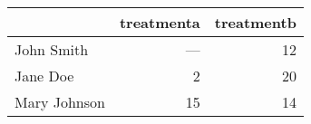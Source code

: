\begin{tabular}{lrr}
  \toprule
  & treatmenta & treatmentb \\ 
  \midrule
  John Smith & --- &  12 \\ 
  Jane Doe &   2 &  20 \\ 
  Mary Johnson &  15 &  14 \\ 
   \bottomrule
\end{tabular}
